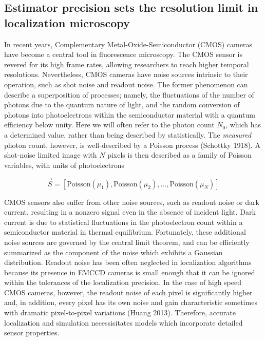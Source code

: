 \documentclass{ucetd}
\begin{document}
\subsection{Estimator precision sets the resolution limit in localization microscopy}

In recent years, Complementary Metal-Oxide-Semiconductor (CMOS) cameras have become a central tool in fluorescence microscopy. The CMOS sensor is revered for its high frame rates, allowing researchers to reach higher temporal resolutions. Nevertheless, CMOS cameras have noise sources intrinsic to their operation, such as shot noise and readout noise. The former phenomenon can describe a superposition of processes; namely, the fluctuations of the number of photons due to the quantum nature of light, and the random conversion of photons into photoelectrons within the semiconductor material with a quantum efficiency below unity. Here we will often refer to the photon count $N_{0}$, which has a determined value, rather than being described by statistically. The \emph{measured} photon count, however, is well-described by a Poisson process (Schottky 1918). A shot-noise limited image with $N$ pixels is then described as a family of Poisson variables, with units of photoelectrons


\begin{equation}
\vec{S} = \left[\mathrm{Poisson}(\mu_{1}), \mathrm{Poisson}(\mu_{2}), ..., \mathrm{Poisson}(\mu_{N})\right]
\end{equation}

CMOS sensors also suffer from other noise sources, such as readout noise or dark current, resulting in a nonzero signal even in the absence of incident light. Dark current is due to statistical fluctuations in the photoelectron count within a semiconductor material in thermal equilibrium. Fortunately, these additional noise sources are governed by the central limit theorem, and can be efficiently summarized as the component of the noise which exhibits a Gaussian distribution. Readout noise has been often neglected in localization algorithms because its presence in EMCCD cameras is small enough that it can be ignored within the tolerances of the localization precision. In the case of high speed CMOS cameras, however, the readout noise of each pixel is significantly higher and, in addition, every pixel has its own noise and gain characteristic sometimes with dramatic pixel-to-pixel variations (Huang 2013). Therefore, accurate localization and simulation necessisitates models which incorporate detailed sensor properties. 
\end{document}
